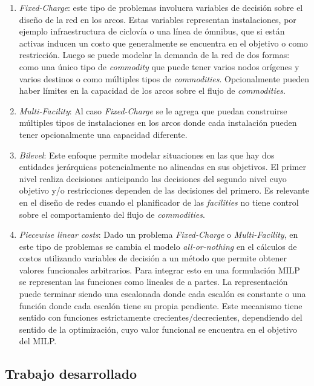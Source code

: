 \documentclass{article}
\begin{document}
  \begin{enumerate}
    \item{{\it Fixed-Charge}: este tipo de problemas involucra variables de decisión sobre el diseño de la red en los arcos. Estas variables representan instalaciones, por ejemplo infraestructura de ciclovía o una línea de ómnibus, que si están activas inducen un costo que generalmente se encuentra en el objetivo o como restricción. Luego se puede modelar la demanda de la red de dos formas: como una único tipo de {\it commodity} que puede tener varios nodos orígenes y varios destinos o como múltiples tipos de {\it commodities}. Opcionalmente pueden haber límites en la capacidad de los arcos sobre el flujo de {\it commodities}.}
    \item{{\it Multi-Facility}: Al caso {\it Fixed-Charge} se le agrega que puedan construirse múltiples tipos de instalaciones en los arcos donde cada instalación pueden tener opcionalmente una capacidad diferente.}
    \item{{\it Bilevel}: Este enfoque permite modelar situaciones en las que hay dos entidades jerárquicas potencialmente no alineadas en sus objetivos. El primer nivel realiza decisiones anticipando las decisiones del segundo nivel cuyo objetivo y/o restricciones dependen de las decisiones del primero. Es relevante en el diseño de redes cuando el planificador de las {\it facilities} no tiene control sobre el comportamiento del flujo de {\it commodities}.}
    \item{{\it Piecewise linear costs}: Dado un problema {\it Fixed-Charge} o {\it Multi-Facility}, en este tipo de problemas se cambia el modelo {\it all-or-nothing} en el cálculos de costos utilizando variables de decisión a un método que permite obtener valores funcionales arbitrarios. Para integrar esto en una formulación MILP se representan las funciones como lineales de a partes. La representación puede terminar siendo una escalonada donde cada escalón es constante o una función donde cada escalón tiene su propia pendiente. Este mecanismo tiene sentido con funciones estrictamente crecientes/decrecientes, dependiendo del sentido de la optimización, cuyo valor funcional se encuentra en el objetivo del MILP.}
  \end{enumerate}

  \subsection{Trabajo desarrollado}
\end{document}
